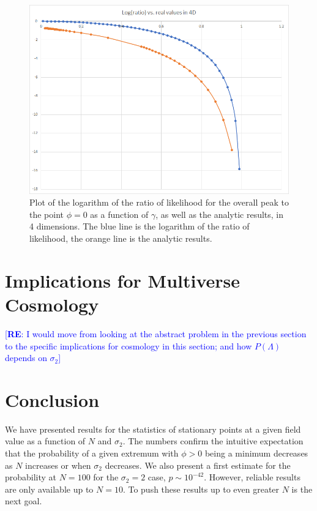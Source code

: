 \documentclass[12pt]{article}
\newcommand{\re}[1]{\textcolor{blue}{[{\bf RE}: #1]}}
\begin{document}
\begin{figure} \label{LogRatioNoFit}
  \centering
  \includegraphics[width=\linewidth]{LogRatioNoFit.png}
  \caption{Plot of the logarithm of the ratio of likelihood for the overall peak to the point $\phi = 0$ as a function of $\gamma$, as well as the analytic results, in 4 dimensions. The blue line is the logarithm of the ratio of likelihood, the orange line is the analytic results.}
  \label{Likelihood}
\end{figure}

\section{Implications for Multiverse Cosmology}

\re{I would move from looking at the abstract problem in the previous section to the specific implications for cosmology in this section; and how $P(\Lambda)$ depends on $\sigma_2$}

\section{Conclusion}
We have presented results for the statistics of stationary points at a given field value as a function of $N$ and $\sigma_2$. The numbers confirm the intuitive expectation that the probability of a given extremum with $\phi > 0$ being a minimum decreases as $N$ increases or when $\sigma_2$ decreases. We also present a first estimate for the probability at $N=100$ for the $\sigma_2=2$ case, $p \sim 10^{-42}$. However, reliable results are only available up to $N=10$. To push these results up to even greater $N$ is the next goal.
\end{document}
